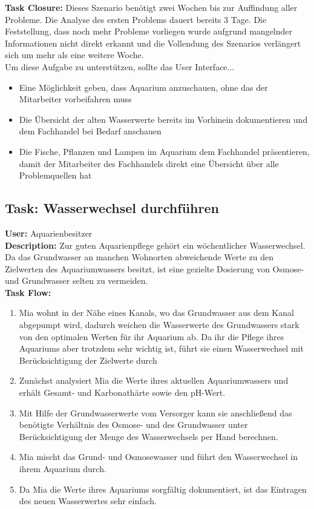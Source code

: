  \textbf{Task Closure:} Dieses Szenario benötigt zwei Wochen bis zur Auffindung aller Probleme. Die Analyse des ersten Problems dauert bereits 3 Tage. Die Feststellung, dass noch mehr Probleme vorliegen wurde aufgrund mangelnder Informationen nicht direkt erkannt und die Vollendung des Szenarios verlängert sich um mehr als eine weitere Woche.\\

Um diese Aufgabe zu unterstützen, sollte das User Interface...
\begin{itemize}
  \item Eine Möglichkeit geben, dass Aquarium anzuschauen, ohne das der Mitarbeiter vorbeifahren muss
  \item Die Übersicht der alten Wasserwerte bereits im Vorhinein dokumentieren und dem Fachhandel bei Bedarf anschauen
  \item Die Fische, Pflanzen und Lampen im Aquarium dem Fachhandel präsentieren, damit der Mitarbeiter des Fachhandels direkt eine Übersicht über alle Problemquellen hat
\end{itemize}


\subsection{\textbf{Task: }Wasserwechsel durchführen}

\textbf{User:} Aquarienbesitzer\\

\textbf{Description:} Zur guten Aquarienpflege gehört ein wöchentlicher Wasserwechsel. Da das Grundwasser an manchen Wohnorten abweichende Werte zu den Zielwerten des Aquariumwassers besitzt, ist eine gezielte Dosierung von Osmose- und Grundwasser selten zu vermeiden.\\

\textbf{Task Flow:}
\begin{enumerate}
 \item Mia wohnt in der Nähe eines Kanals, wo das Grundwasser aus dem Kanal abgepumpt wird, dadurch weichen die Wasserwerte des Grundwassers stark von den optimalen Werten für ihr Aquarium ab. Da ihr die Pflege ihres Aquariums aber trotzdem sehr wichtig ist, führt sie einen Wasserwechsel mit Berücksichtigung der Zielwerte durch
 \item Zunächst analysiert Mia die Werte ihres aktuellen Aquariumwassers und erhält Gesamt- und Karbonathärte sowie den pH-Wert.
 \item Mit Hilfe der Grundwasserwerte vom Versorger kann sie anschließend das benötigte Verhältnis des Osmose- und des Grundwasser unter Berücksichtigung der Menge des Wasserwechsels per Hand berechnen.
 \item Mia mischt das Grund- und Osmosewasser und führt den Wasserwechsel in ihrem Aquarium durch.
 \item Da Mia die Werte ihres Aquariums sorgfältig dokumentiert, ist das Eintragen des neuen Wasserwertes sehr einfach.
\end{enumerate}

